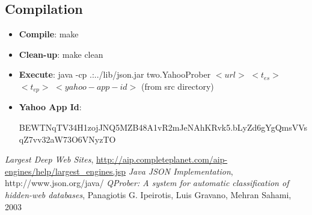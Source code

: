 \documentclass[11pt]{article}
\begin{document}
\subsection* {Compilation}
\begin{itemize}
\item \textbf{Compile}: make
\item \textbf{Clean-up}: make clean
\item\textbf{Execute}: java -cp .:../lib/json.jar two.YahooProber  $<url>$ $<t_{es}>$ $<t_{ep}>$ $<yahoo-app-id>$ (from src directory)
\item \textbf{Yahoo App Id}:

BEWTNqTV34H1zojJNQ5MZB48A1vR2mJeNAhKRvk5.bLyZd6gYgQmsVVsqZ7vv32aW73O6VNyzTO
\end{itemize}


\begin{thebibliography}{50}
 \textit{Largest Deep Web Sites}, \url{http://aip.completeplanet.com/aip-engines/help/largest_engines.jsp}
 \textsl{Java JSON Implementation}, http://www.json.org/java/
 \textit{QProber: A system for automatic classification of hidden-web databases}, Panagiotis G. Ipeirotis, Luis Gravano, Mehran Sahami, 2003
\end{thebibliography}
\end{document}
